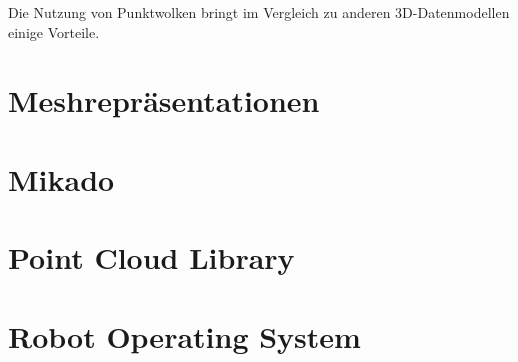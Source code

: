 Die Nutzung von Punktwolken bringt im Vergleich zu anderen 3D-Datenmodellen einige Vorteile. 


\section{Meshrepräsentationen}


\section{Mikado}


\section{Point Cloud Library}


\section{Robot Operating System}
